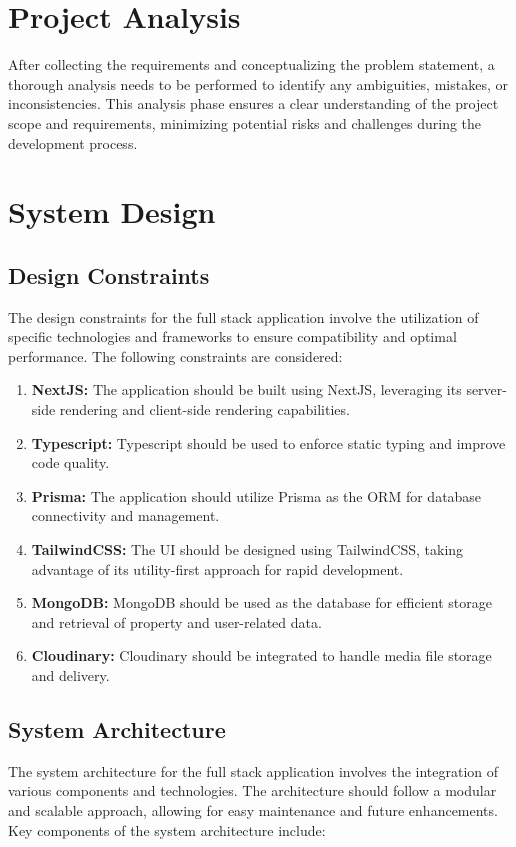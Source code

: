 \section{Project Analysis}
After collecting the requirements and conceptualizing the problem statement, a thorough analysis needs to be performed to identify any ambiguities, mistakes, or inconsistencies. This analysis phase ensures a clear understanding of the project scope and requirements, minimizing potential risks and challenges during the development process.

\section{System Design}
\subsection{Design Constraints}
The design constraints for the full stack application involve the utilization of specific technologies and frameworks to ensure compatibility and optimal performance. The following constraints are considered:
\begin{enumerate}
	\item \textbf{NextJS: } The application should be built using NextJS, leveraging its server-side rendering and client-side rendering capabilities.
	\item \textbf{Typescript:} Typescript should be used to enforce static typing and improve code quality.
	\item \textbf{Prisma:} The application should utilize Prisma as the ORM for database connectivity and management.
	\item \textbf{TailwindCSS:} The UI should be designed using TailwindCSS, taking advantage of its utility-first approach for rapid development.
	\item \textbf{MongoDB:} MongoDB should be used as the database for efficient storage and retrieval of property and user-related data.
	\item \textbf{Cloudinary:} Cloudinary should be integrated to handle media file storage and delivery.
\end{enumerate}

\subsection{System Architecture}
The system architecture for the full stack application involves the integration of various components and technologies. The architecture should follow a modular and scalable approach, allowing for easy maintenance and future enhancements. Key components of the system architecture include:

